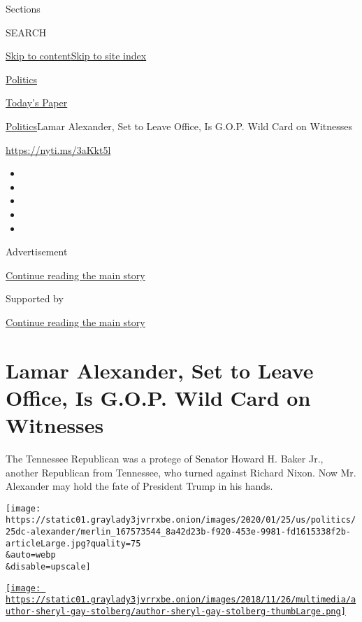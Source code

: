 Sections

SEARCH

\protect\hyperlink{site-content}{Skip to
content}\protect\hyperlink{site-index}{Skip to site index}

\href{https://www.nytimes3xbfgragh.onion/section/politics}{Politics}

\href{https://myaccount.nytimes3xbfgragh.onion/auth/login?response_type=cookie\&client_id=vi}{}

\href{https://www.nytimes3xbfgragh.onion/section/todayspaper}{Today's
Paper}

\href{/section/politics}{Politics}\textbar{}Lamar Alexander, Set to
Leave Office, Is G.O.P. Wild Card on Witnesses

\url{https://nyti.ms/3aKkt5l}

\begin{itemize}
\item
\item
\item
\item
\item
\end{itemize}

Advertisement

\protect\hyperlink{after-top}{Continue reading the main story}

Supported by

\protect\hyperlink{after-sponsor}{Continue reading the main story}

\hypertarget{lamar-alexander-set-to-leave-office-is-gop-wild-card-on-witnesses}{%
\section{Lamar Alexander, Set to Leave Office, Is G.O.P. Wild Card on
Witnesses}\label{lamar-alexander-set-to-leave-office-is-gop-wild-card-on-witnesses}}

The Tennessee Republican was a protege of Senator Howard H. Baker Jr.,
another Republican from Tennessee, who turned against Richard Nixon. Now
Mr. Alexander may hold the fate of President Trump in his hands.

\texttt{[image: https://static01.graylady3jvrrxbe.onion/images/2020/01/25/us/politics/25dc-alexander/merlin\_167573544\_8a42d23b-f920-453e-9981-fd1615338f2b-articleLarge.jpg?quality=75\\\&auto=webp\\\&disable=upscale]}

\href{https://www.nytimes3xbfgragh.onion/by/sheryl-gay-stolberg}{\texttt{[image: https://static01.graylady3jvrrxbe.onion/images/2018/11/26/multimedia/author-sheryl-gay-stolberg/author-sheryl-gay-stolberg-thumbLarge.png]}}

